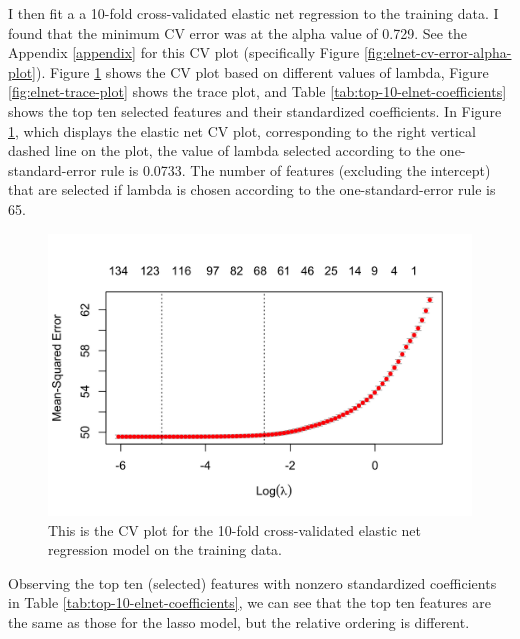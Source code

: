 \documentclass[
]{article}
\begin{document}
I then fit a a 10-fold cross-validated elastic net regression to the training data. I found that the minimum CV error was at the alpha value of 0.729. See the Appendix \ref{appendix} for this CV plot (specifically Figure \ref{fig:elnet-cv-error-alpha-plot}). Figure \ref{fig:elnet-cv-plot} shows the CV plot based on different values of lambda, Figure \ref{fig:elnet-trace-plot} shows the trace plot, and Table \ref{tab:top-10-elnet-coefficients} shows the top ten selected features and their standardized coefficients. In Figure \ref{fig:elnet-cv-plot}, which displays the elastic net CV plot, corresponding to the right vertical dashed line on the plot, the value of lambda selected according to the one-standard-error rule is 0.0733. The number of features (excluding the intercept) that are selected if lambda is chosen according to the one-standard-error rule is 65.

\begin{figure}[H]

{\centering \includegraphics[width=0.8\linewidth]{../results/elnet-cv-plot} 

}

\caption{This is the CV plot for the 10-fold cross-validated elastic net regression model on the training data.}\label{fig:elnet-cv-plot}
\end{figure}

Observing the top ten (selected) features with nonzero standardized coefficients in Table \ref{tab:top-10-elnet-coefficients}, we can see that the top ten features are the same as those for the lasso model, but the relative ordering is different.
\end{document}
